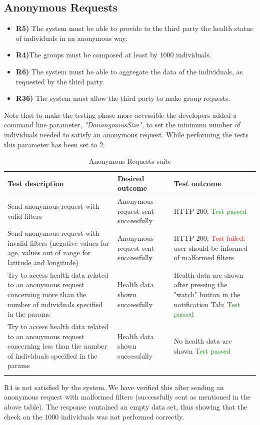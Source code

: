 \documentclass[titlepage]{article}
\begin{document}

\subsection{Anonymous Requests}
\begin{itemize}
    \item {\bf R5)} The system must be able to provide to the third party the health status of individuals in an anonymous way.
    \item {\bf R4)}The groups must be composed at least by 1000 individuals.
    \item {\bf R6)} The system must be able to aggregate the data of the individuals, as requested by the third party.
    \item {\bf R36)} The system must allow the third party to make group requests.
\end{itemize}

\noindent
Note that to make the testing phase more accessible the developers added a command line parameter, {\it  "DanonymousSize"}, to set the minimum number of individuals needed to satisfy an anonymous request. While performing the tests this parameter has been set to 2.

\begin{longtable}{| p{3 cm} | p{4 cm} | p{4 cm} |} \hline
    {\bf Test description} & {\bf Desired outcome} & {\bf Test outcome} \\ \hline
    Send anonymous request with valid filters & 
    Anonymous request sent successfully
        & HTTP 200; \textcolor{green}{Test passed} \\ \hline
    Send anonymous request with invalid filters (negative values for age, values out of range for latitude and longitude) & 
    Anonymous request sent successfully
        & HTTP 200; \textcolor{red}{Test failed}: user should be informed of malformed filters\\ \hline
   Try to access health data related to an anonymous request concerning more than the number of individuals specified in the params & 
Health data shown successfully
& Health data are shown after pressing the "watch"   button in the notification Tab; \textcolor{green}{Test passed}\\ \hline
Try to access health data related to an anonymous request concerning less than the number of individuals specified in the params & 
Health data shown successfully
& No health data are shown  \textcolor{green}{Test passed}\\ \hline
    \caption{Anonymous Requests suite}
\end{longtable}
\noindent
R4 is not satisfied by the system. We have verified this after sending an anonymous request with malformed filters (successfully sent as mentioned in the above table). The response contained an empty data set, thus showing that the check on the 1000 individuals was not performed correctly.
\end{document}
